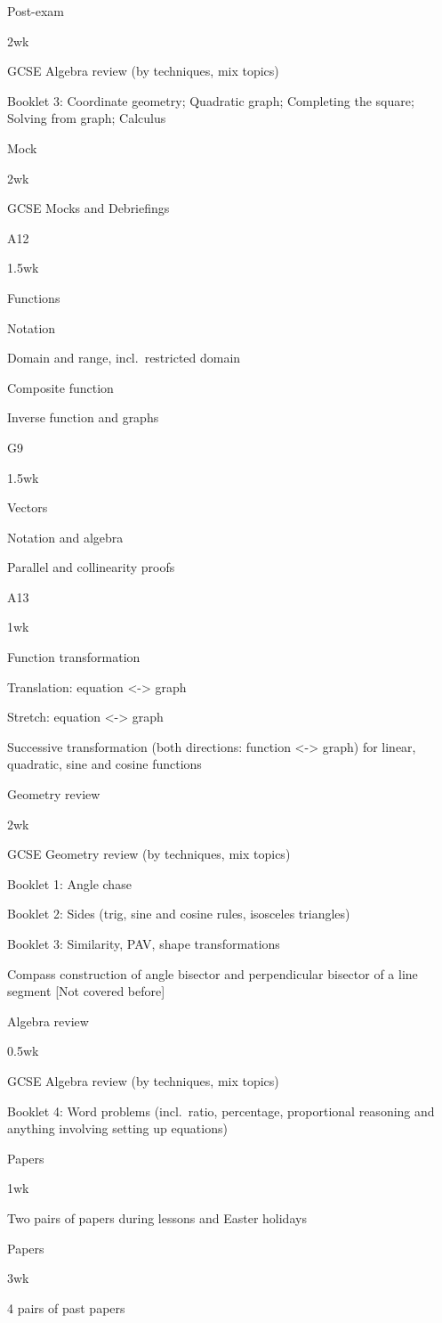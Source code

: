 \documentclass[
]{article}
\begin{document}
Post-exam

2wk

GCSE Algebra review (by techniques, mix topics)

Booklet 3: Coordinate geometry; Quadratic graph; Completing the square;
Solving from graph; Calculus

Mock

2wk

GCSE Mocks and Debriefings

A12

1.5wk

Functions

Notation

Domain and range, incl.~restricted domain

Composite function

Inverse function and graphs

G9

1.5wk

Vectors

Notation and algebra

Parallel and collinearity proofs

A13

1wk

Function transformation

Translation: equation \textless-\textgreater{} graph

Stretch: equation \textless-\textgreater{} graph

Successive transformation (both directions: function
\textless-\textgreater{} graph) for linear, quadratic, sine and cosine
functions

Geometry review

2wk

GCSE Geometry review (by techniques, mix topics)

Booklet 1: Angle chase

Booklet 2: Sides (trig, sine and cosine rules, isosceles triangles)

Booklet 3: Similarity, PAV, shape transformations

Compass construction of angle bisector and perpendicular bisector of a
line segment {[}Not covered before{]}

Algebra review

0.5wk

GCSE Algebra review (by techniques, mix topics)

Booklet 4: Word problems (incl.~ratio, percentage, proportional
reasoning and anything involving setting up equations)

Papers

1wk

Two pairs of papers during lessons and Easter holidays

Papers

3wk

4 pairs of past papers
\end{document}
